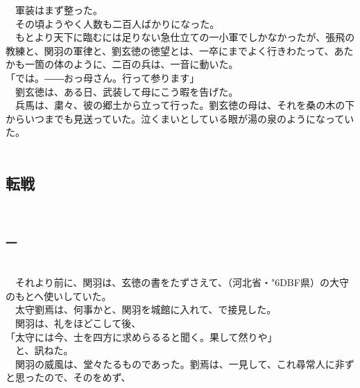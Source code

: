 \documentclass[
  paper=a5,
  fontsize=10pt,
  jafontsize=9.5pt,
  tate,                  %
  open_bracket_pos=nibu, %
]{jlreq}
\begin{document}
　軍装はまず整った。\\


　その頃ようやく人数も二百人ばかりになった。\\


　もとより天下に臨むには足りない急仕立ての一小軍でしかなかったが、張飛の教練と、関羽の軍律と、劉玄徳の徳望とは、一卒にまでよく行きわたって、あたかも一箇の体のように、二百の兵は、一音に動いた。\\


「では。――おっ母さん。行って参ります」\\


　劉玄徳は、ある日、武装して母にこう暇を告げた。\\


　兵馬は、粛々、彼の郷土から立って行った。劉玄徳の母は、それを桑の木の下からいつまでも見送っていた。泣くまいとしている眼が湯の泉のようになっていた。\\

\\

\subsection{転戦}

\\

\subsubsection{一}

\\


　それより前に、関羽は、玄徳の書をたずさえて、（河北省・{\char"6DBF}県）の大守のもとへ使いしていた。\\


　太守劉焉は、何事かと、関羽を城館に入れて、で接見した。\\


　関羽は、礼をほどこして後、\\


「太守には今、士を四方に求めらるると聞く。果して然りや」\\


　と、訊ねた。\\


　関羽の威風は、堂々たるものであった。劉焉は、一見して、これ尋常人に非ずと思ったので、そのをめず、\\
\end{document}
